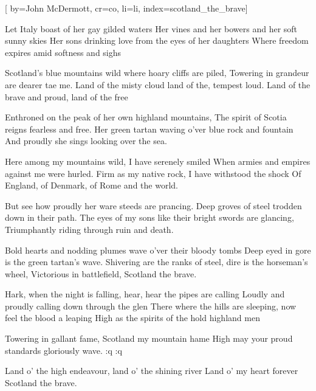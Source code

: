 

[%
    by={John McDermott},
    cr={co},
    li={li},
    index={scotland_the_brave}]


    \label{scotland_the_brave}

    \beginverse\memorize[verse]
        Let Italy boast of her gay gilded waters
        Her vines and her bowers and her soft sunny skies
        Her sons drinking love from the eyes of her daughters
        Where freedom expires amid softness and sighs
    \endverse

    \beginchorus\memorize[chorus]
        Scotland's blue mountains wild where hoary cliffs are piled,
        Towering in grandeur are dearer tae me.
        Land of the misty cloud land of the, tempest loud.
        Land of the brave and proud, land of the free
    \endchorus

    \beginverse\replay[verse]
        Enthroned on the peak of her own highland mountains,
        The spirit of Scotia reigns fearless and free.
        Her green tartan waving o'ver blue rock and fountain
        And proudly she sings looking over the sea.
    \endverse

    \beginchorus\replay[chorus]
        Here among my mountains wild, I have serenely smiled
        When armies and empires against me were hurled.
        Firm as my native rock, I have withstood the shock
        Of England, of Denmark, of Rome and the world.
    \endchorus

    \beginverse\replay[verse]
        But see how proudly her ware steeds are prancing.
        Deep groves of steel trodden down in their path.
        The eyes of my sons like their bright swords are glancing,
        Triumphantly riding through ruin and death.
    \endverse

    \beginchorus\replay[chorus]
        Bold hearts and nodding plumes wave o'ver their bloody tombs
        Deep eyed in gore is the green tartan's wave.
        Shivering are the ranks of steel, dire is the horseman's wheel,
        Victorious in battlefield, Scotland the brave.
    \endchorus

    \beginverse\replay[verse]
        Hark, when the night is falling, hear, hear the pipes are calling
        Loudly and proudly calling down through the glen
        There where the hills are sleeping, now feel the blood a leaping
        High as the spirits of the hold highland men
    \endverse

    \beginchorus\replay[chorus]
        Towering in gallant fame, Scotland my mountain hame
        High may your proud standards gloriously wave.
        :q
        :q

        Land o' the high endeavour, land o' the shining river
        Land o' my heart forever Scotland the brave.
    \endchorus
\endsong
